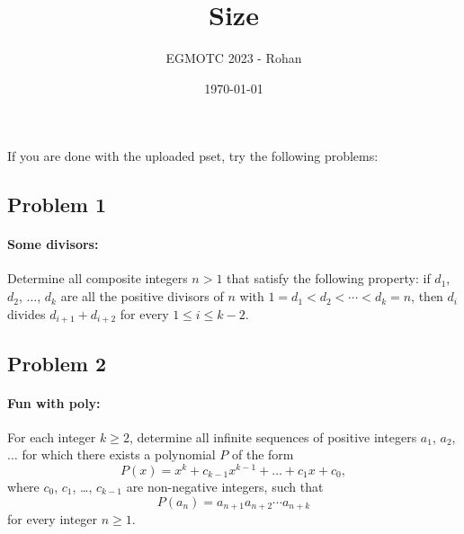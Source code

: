 \documentclass[12pt]{article}
\title{Size}
\author{EGMOTC 2023 - Rohan}
\date{\today}
\begin{document}
\maketitle

\newcommand{\localtextbulletone}{\textcolor{black}{\raisebox{.45ex}{\rule{.6ex}{.6ex}}}}
\renewcommand{\labelitemi}{\localtextbulletone}

\newtheorem{definition}{Definition}
\newtheorem{theorem}{Theorem}
\newtheorem{corollary}{Corollary}

\thispagestyle{empty}

If you are done with the uploaded pset, try the following problems:

\subsection*{Problem 1}
\paragraph*{Some divisors:} Determine all composite integers $n>1$ that satisfy the following property: if $d_1$, $d_2$, $\ldots$, $d_k$ are all the positive divisors of $n$ with $1 = d_1 < d_2 < \cdots < d_k = n$, then $d_i$ divides $d_{i+1} + d_{i+2}$ for every $1 \leq i \leq k - 2$.

\subsection*{Problem 2}
\paragraph*{Fun with poly:} For each integer $k\geq 2$, determine all infinite sequences of positive integers $a_1$, $a_2$, $\ldots$ for which there exists a polynomial $P$ of the form\[ P(x)=x^k+c_{k-1}x^{k-1}+\dots + c_1 x+c_0, \]where $c_0$, $c_1$, \dots, $c_{k-1}$ are non-negative integers, such that\[ P(a_n)=a_{n+1}a_{n+2}\cdots a_{n+k} \]for every integer $n\geq 1$.
\end{document}
